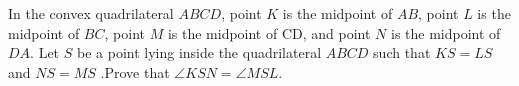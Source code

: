 In the convex quadrilateral $ABCD$, point $K$ is the midpoint of $AB$, point $L$ is the midpoint of $BC$, point $M$ is the midpoint of CD, and point $N$ is the midpoint of $DA$. Let $S$ be a point lying inside the quadrilateral $ABCD$ such that $KS = LS$ and  $NS = MS$ .Prove that $\angle KSN =  \angle MSL$.